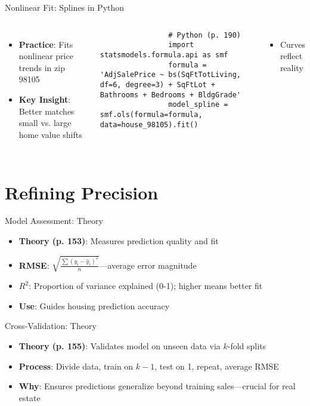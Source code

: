 \documentclass{beamer}
\begin{document}
	\begin{frame}[fragile]{Nonlinear Fit: Splines in Python}
		\lstset{language=Python}
		\begin{columns}
			\begin{itemize}
				\item \textbf{Practice}: Fits nonlinear price trends in zip 98105
				\item \textbf{Key Insight}: Better matches small vs. large home value shifts
			\end{itemize}
			\begin{lstlisting}
				# Python (p. 190)
				import statsmodels.formula.api as smf
				formula = 'AdjSalePrice ~ bs(SqFtTotLiving, df=6, degree=3) + SqFtLot + Bathrooms + Bedrooms + BldgGrade'
				model_spline = smf.ols(formula=formula, data=house_98105).fit()
			\end{lstlisting}
			\begin{itemize}
				\item Curves reflect reality
			\end{itemize}
		\end{columns}
	\end{frame}
	
	\section{Refining Precision}
	
	\begin{frame}{Model Assessment: Theory}
		\begin{itemize}
			\item \textbf{Theory (p. 153)}: Measures prediction quality and fit
			\item \textbf{RMSE}: $\sqrt{\frac{\sum (y_i - \hat{y}_i)^2}{n}}$—average error magnitude
			\item \textbf{$R^2$}: Proportion of variance explained (0-1); higher means better fit
			\item \textbf{Use}: Guides housing prediction accuracy
		\end{itemize}
	\end{frame}
	
	\begin{frame}{Cross-Validation: Theory}
		\begin{itemize}
			\item \textbf{Theory (p. 155)}: Validates model on unseen data via $k$-fold splits
			\item \textbf{Process}: Divide data, train on $k-1$, test on 1, repeat, average RMSE
			\item \textbf{Why}: Ensures predictions generalize beyond training sales—crucial for real estate
		\end{itemize}
	\end{frame}
	
\end{document}
